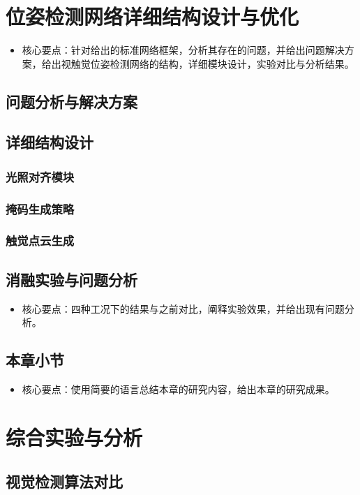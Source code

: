 \documentclass{Diploma}
\begin{document}
\chapter{位姿检测网络详细结构设计与优化}
\begin{itemize}
  \item 核心要点：针对给出的标准网络框架，分析其存在的问题，并给出问题解决方案，给出视触觉位姿检测网络的结构，详细模块设计，实验对比与分析结果。
\end{itemize}
\section{问题分析与解决方案}
\section{详细结构设计}
\subsection{光照对齐模块}
\subsection{掩码生成策略}
\subsection{触觉点云生成}
\section{消融实验与问题分析}
\begin{itemize}
  \item 核心要点：四种工况下的结果与之前对比，阐释实验效果，并给出现有问题分析。
\end{itemize}
\section{本章小节}
\begin{itemize}
  \item 核心要点：使用简要的语言总结本章的研究内容，给出本章的研究成果。
\end{itemize}
\chapter{综合实验与分析}
\section{视觉检测算法对比}
\end{document}
